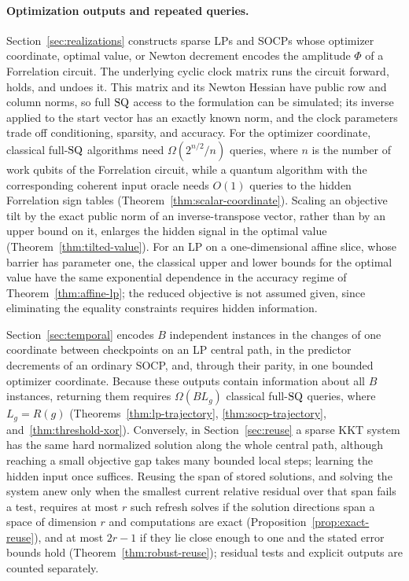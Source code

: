 \paragraph{Optimization outputs and repeated queries.}
Section~\ref{sec:realizations} constructs sparse LPs and SOCPs whose
optimizer coordinate, optimal value, or Newton decrement encodes the
amplitude $\Phi$ of a Forrelation circuit. The underlying cyclic clock
matrix runs the circuit forward, holds, and undoes it. This matrix and
its Newton Hessian have public row and column norms, so full $\mathrm{SQ}$ access
to the formulation can be simulated; its inverse applied to the start
vector has an exactly known norm, and the clock parameters trade off
conditioning, sparsity, and accuracy. For the optimizer coordinate, classical full-$\mathrm{SQ}$
algorithms need $\Omega(2^{n/2}/n)$ queries, where $n$ is the number of
work qubits of the Forrelation circuit, while a quantum algorithm
with the corresponding coherent input oracle needs $O(1)$ queries to the
hidden Forrelation sign tables
(Theorem~\ref{thm:scalar-coordinate}). Scaling an objective tilt by the exact
public norm of an inverse-transpose vector, rather than by an upper bound
on it, enlarges the hidden signal in the optimal value
(Theorem~\ref{thm:tilted-value}). For an LP on a one-dimensional affine
slice, whose barrier has parameter one, the classical upper and lower
bounds for the optimal value have the same exponential dependence in the
accuracy regime of Theorem~\ref{thm:affine-lp}; the reduced objective is not assumed
given, since eliminating the equality constraints requires hidden
information.

Section~\ref{sec:temporal} encodes $B$ independent instances in the
changes of one coordinate between checkpoints on an LP central path, in
the predictor decrements of an ordinary SOCP, and, through their parity,
in one bounded optimizer coordinate. Because these outputs contain
information about all $B$ instances, returning them requires
$\Omega(BL_g)$ classical full-$\mathrm{SQ}$ queries, where $L_g=R(g)$
(Theorems~\ref{thm:lp-trajectory}, \ref{thm:socp-trajectory},
and~\ref{thm:threshold-xor}). Conversely, in Section~\ref{sec:reuse} a
sparse KKT system has the same hard normalized solution along the whole
central path, although reaching a small objective gap takes many bounded
local steps; learning the hidden input once suffices. Reusing the span of stored
solutions, and solving the system anew only when the smallest current
relative residual over that span fails a test, requires at most $r$ such
refresh solves if the solution directions span a space of
dimension $r$ and computations are exact (Proposition~\ref{prop:exact-reuse}),
and at most $2r-1$ if they lie close enough to one and the stated error
bounds hold (Theorem~\ref{thm:robust-reuse}); residual tests and
explicit outputs are counted separately.

